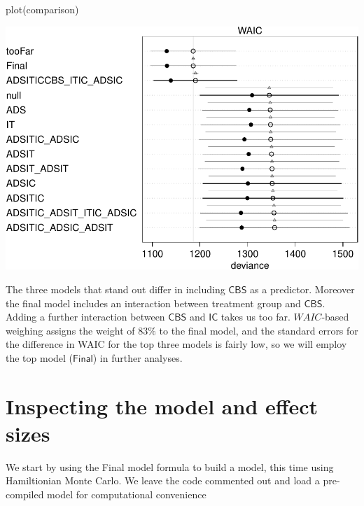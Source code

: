 \documentclass[
  10pt,
  dvipsnames,enabledeprecatedfontcommands]{scrartcl}
\newenvironment{Shaded}{\begin{snugshade}}{\end{snugshade}}
\newcommand{\FunctionTok}[1]{\textcolor[rgb]{0.00,0.00,0.00}{#1}}
\newcommand{\NormalTok}[1]{#1}
\begin{document}
\begin{Shaded}
\begin{Highlighting}[]
\FunctionTok{plot}\NormalTok{(comparison)}
\end{Highlighting}
\end{Shaded}

\begin{center}\includegraphics[width=1\linewidth]{bayesianReport3_files/figure-latex/unnamed-chunk-9-1} \end{center}
\normalsize

The three models that stand out differ in including \(\mathsf{CBS}\) as
a predictor. Moreover the final model includes an interaction between
treatment group and \(\mathsf{CBS}\). Adding a further interaction
between \(\mathsf{CBS}\) and \(\mathsf{IC}\) takes us too far.
\(WAIC\)-based weighing assigns the weight of \(83\%\) to the final
model, and the standard errors for the difference in WAIC for the top
three models is fairly low, so we will employ the top model
(\(\mathsf{Final}\)) in further analyses.

\hypertarget{inspecting-the-model-and-effect-sizes}{%
\section{Inspecting the model and effect
sizes}\label{inspecting-the-model-and-effect-sizes}}

We start by using the \textsf{Final} model formula to build a model,
this time using Hamiltionian Monte Carlo. We leave the code commented
out and load a pre-compiled model for computational convenience

\vspace{1mm}
\footnotesize
\end{document}
